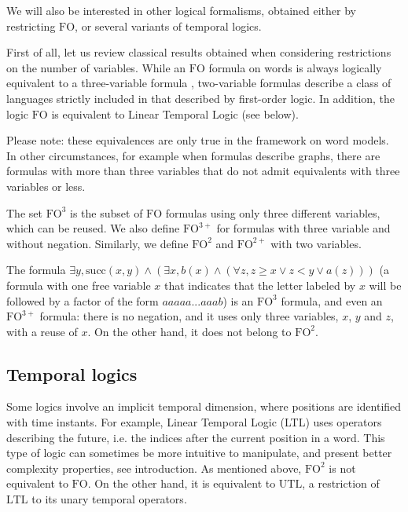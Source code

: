 \documentclass[a4paper,UKenglish,cleveref, autoref, thm-restate]{lipics-v2021}
\newcommand{\FO}{\mathrm{FO}}
\newcommand{\FOth}{\FO^3}
\newcommand{\FOthp}{\FO^{3+}}
\newcommand{\FOtw}{\FO^2}
\newcommand{\FOtwp}{\FO^{2+}}
\newcommand{\LTL}{\mathrm{LTL}}
\newcommand{\UTL}{\mathrm{UTL}}
\renewcommand{\succ}{\mathrm{succ}}
\begin{document}
We will also be interested in other logical formalisms, obtained either by restricting $\FO$, or several variants of temporal logics.

First of all, let us review classical results  obtained when considering restrictions on the number of variables. While an $\FO$ formula on words is always logically equivalent to a three-variable formula \cite{Kamp}, two-variable formulas describe a class of languages strictly included in that described by first-order logic. In addition, the logic $\FO$ is equivalent to Linear Temporal Logic (see below).


Please note: these equivalences are only true in the framework on word models. In other circumstances, for example when formulas describe graphs, there are formulas with more than three variables that do not admit equivalents with three variables or less.



 


\begin{definition}
    The set $\FOth$ is the subset of $\FO$ formulas using only three different variables, which can be reused. We also define $\FOthp$ for formulas with three variable and without negation. Similarly, we define $\FOtw$ and $\FOtwp$ with two variables.
\end{definition}


\begin{example}
    The formula $\exists y, \succ(x,y) \land (\exists x, b(x) \land (\forall z, z \geq x \lor z < y \lor a(z) ))$ (a formula with one free variable $x$ that indicates that the letter labeled by $x$ will be followed by a factor of the form $aaaaa. ..aaab$) is an $\FOth$ formula, and even an $\FOthp$ formula: there is no negation, and it uses only three variables, $x$, $y$ and $z$, with a reuse of $x$. On the other hand, it does not belong to $\FOtw$.
\end{example}




\subsection{Temporal logics} \label{sec:TL}


Some logics involve an implicit temporal dimension, where positions are identified with time instants.
For example, Linear Temporal Logic (LTL) uses operators describing the future, i.e. the indices after the current position in a word. This type of logic can sometimes be more intuitive to manipulate, and present better complexity properties, see introduction.  As mentioned above, $\FOtw$ is not equivalent to $\FO$. On the other hand, it is equivalent to $\UTL$, a restriction of $\LTL$ to its unary temporal operators. 
\end{document}
